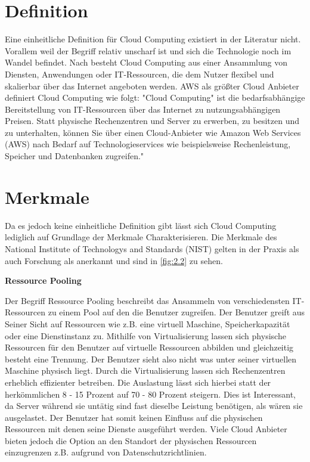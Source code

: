 \section{Definition}
Eine einheitliche Definition  für Cloud Computing existiert in der Literatur nicht. Vorallem weil der Begriff relativ unscharf ist und sich die Technologie noch im Wandel befindet. Nach besteht Cloud Computing aus einer Ansammlung von Diensten, Anwendungen oder IT-Ressourcen, die dem Nutzer flexibel und skalierbar über das Internet angeboten werden. AWS als größter Cloud Anbieter definiert Cloud Computing wie folgt: "Cloud Computing" ist die bedarfsabhängige Bereitstellung von IT-Ressourcen über das Internet zu nutzungsabhängigen Preisen. Statt physische Rechenzentren und Server zu erwerben, zu besitzen und zu unterhalten, können Sie über einen Cloud-Anbieter wie Amazon Web Services (AWS) nach Bedarf auf Technologieservices wie beispielsweise Rechenleistung, Speicher und Datenbanken zugreifen."\cite*[]{AWSCC}

\section{Merkmale}
Da es jedoch keine einheitliche Definition gibt lässt sich Cloud Computing lediglich auf Grundlage der Merkmale Charakterisieren. Die Merkmale des National Institute of Technologys and Standards (NIST) gelten in der Praxis als auch Forschung als anerkannt und sind in \autoref{fig:2.2} zu sehen.

\textbf{Ressource Pooling}

Der Begriff Ressource Pooling beschreibt das Ansammeln von verschiedensten IT-Ressourcen zu einem Pool auf den die Benutzer zugreifen. Der Benutzer greift aus Seiner Sicht auf Ressourcen wie z.B. eine virtuell Maschine, Speicherkapazität oder eine Dienstinstanz zu. Mithilfe von Virtualisierung lassen sich physische Ressourcen für den Benutzer auf virtuelle Ressourcen abbilden und gleichzeitig besteht eine Trennung. Der Benutzer sieht also nicht was unter seiner virtuellen Maschine physisch liegt. Durch die Virtualisierung lassen sich Rechenzentren erheblich effizienter betreiben. Die Auslastung lässt sich hierbei statt der herkömmlichen 8 - 15 Prozent auf 70 - 80 Prozent steigern. Dies ist Interessant, da Server während sie untätig sind fast dieselbe Leistung benötigen, als wären sie ausgelastet\cite*[]{VMware}. Der Benutzer hat somit keinen Einfluss auf die physischen Ressourcen mit denen seine Dienste ausgeführt werden. Viele Cloud Anbieter bieten jedoch die Option an den Standort der physischen Ressourcen einzugrenzen z.B. aufgrund von Datenschutzrichtlinien. \cite*[]{DAAS}

